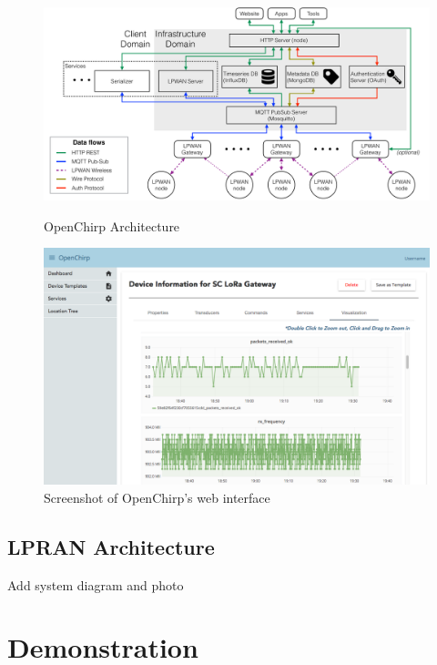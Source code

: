 \documentclass[conference]{IEEEtran}
\begin{document}
\begin{figure}[!htb]
    \centering
    \begin{minipage}[b]{.6\textwidth}
        \centering
        \includegraphics[width=\linewidth]{figures/openChirp_architecture}
        \caption{OpenChirp Architecture}
        \label{fig:oc-arch}
    \end{minipage}%
    \begin{minipage}[b]{.4\textwidth}
        \centering
        \includegraphics[width=\linewidth]{figures/OC_screenshot}
        \caption{Screenshot of OpenChirp's web interface}
        \label{fig:oc-screenshot}
    \end{minipage}
\end{figure}

\subsection{LPRAN Architecture}
\label{sec:lpran-arch}



{\color{red} Add system diagram and photo}

\section{Demonstration}
\label{sec:demo}
\end{document}
